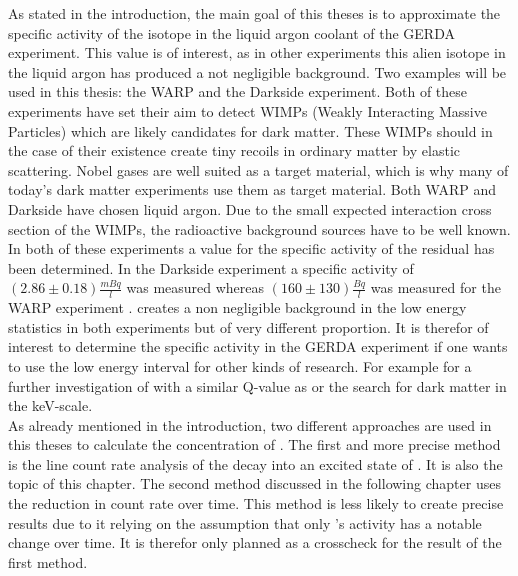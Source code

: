 \documentclass[encoding=utf8,british]{tumphthesis}
\begin{document}
As stated in the introduction, the main goal of this theses is to approximate the specific activity of the isotope \Kr in the liquid argon coolant of the GERDA experiment. 
This value is of interest, as in other experiments this alien isotope in the liquid argon has produced a not negligible background. 
Two examples will be used in this thesis: the WARP and the Darkside experiment.
Both of these experiments have set their aim to detect WIMPs (Weakly Interacting Massive Particles) which are likely candidates for dark matter.
These WIMPs should in the case of their existence create tiny recoils in ordinary matter by elastic scattering.
Nobel gases are well suited as a target material, which is why many of today's dark matter experiments use them as target material.
Both WARP and Darkside have chosen liquid argon.
Due to the small expected interaction cross section of the WIMPs, the radioactive background sources have to be well known.
In both of these experiments a value for the specific activity of the residual \Kr has been determined.
In the Darkside experiment a specific activity of  \((2.86\pm0.18) \frac{\unit{mBq}}{\unit{l}}\)  \cite{agnes_results_2016} was measured whereas  \((160\pm130)\frac{\unit{Bq}}{\unit{l}}\) was measured for the WARP experiment \cite{benetti_measurement_2006}.
\Kr creates a non negligible background in the low energy statistics in both experiments but of very different proportion. 
It is therefor of interest to determine the specific activity in the GERDA experiment if one wants to use the low energy interval for other kinds of research.
For example for a further investigation of  with a similar Q-value as \Kr or the search for dark matter in the keV-scale.
\\

As already mentioned in the introduction, two different approaches are used in this theses to calculate the concentration of \Kr. 
The first and more precise method is the line count rate analysis of the \Kr decay into an excited state of . 
It is also the topic of this chapter.
The second method discussed in the following chapter uses the reduction in count rate over time. 
This method is less likely to create precise results due to it relying on the assumption that only \Kr's activity has a notable change over time.
It is therefor only planned as a crosscheck for the result of the first method.
\\
\end{document}
